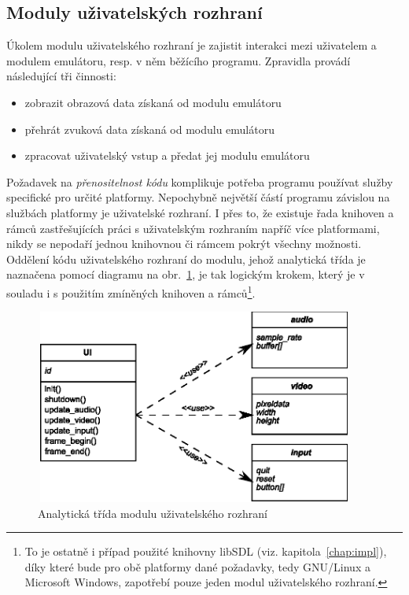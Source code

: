 %
%

\subsection{Moduly uživatelských rozhraní}

Úkolem modulu uživatelského rozhraní je zajistit interakci mezi uživatelem a
modulem emulátoru, resp. v něm běžícího programu. Zpravidla provádí následující
tři činnosti:

\begin{itemize}
\item zobrazit obrazová data získaná od modulu emulátoru
\item přehrát zvuková data získaná od modulu emulátoru
\item zpracovat uživatelský vstup a předat jej modulu emulátoru
\end{itemize}

Požadavek na {\em přenositelnost kódu} komplikuje potřeba programu používat
služby specifické pro určité platformy. Nepochybně největší částí programu
závislou na službách platformy je uživatelské rozhraní. I přes to, že existuje
řada knihoven a rámců zastřešujících práci s uživatelským rozhraním napříč více
platformami, nikdy se nepodaří jednou knihovnou či rámcem pokrýt všechny
možnosti. Oddělení kódu uživatelského rozhraní do modulu, jehož analytická
třída je naznačena pomocí diagramu na obr.~\ref{fig:anal_ui}, je tak logickým
krokem, který je v souladu i s použitím zmíněných knihoven a rámců\footnote{To
je ostatně i případ použité knihovny libSDL (viz. kapitola~\ref{chap:impl}),
díky které bude pro obě platformy dané požadavky, tedy GNU/Linux a Microsoft
Windows, zapotřebí pouze jeden modul uživatelského rozhraní.}.

\begin{figure}[ht]
\begin{center}
\includegraphics[width=10.5cm,height=6.4cm]{fig/anal_ui}
\caption{Analytická třída modulu uživatelského rozhraní\label{fig:anal_ui}}
\end{center}
\end{figure}

